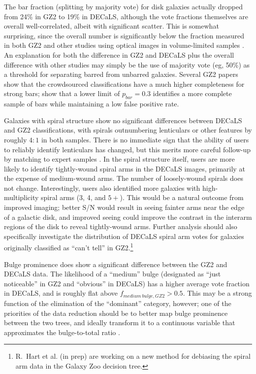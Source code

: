 \documentclass[iop,apj,tighten]{emulateapj}
\begin{document}
The bar fraction (splitting by majority vote) for disk galaxies actually dropped from 24\% in GZ2 to 19\% in DECaLS, although the vote fractions themselves are overall well-correlated, albeit with significant scatter. This is somewhat surprising, since the overall number is significantly below the fraction measured in both GZ2 \citep{mas11c} and other studies using optical images in volume-limited samples \citep[eg,][]{bar08,agu09,lee12}. An explanation for both the difference in GZ2 and DECaLS plus the overall difference with other studies may simply be the use of majority vote (eg, 50\%) as a threshold for separating barred from unbarred galaxies. Several GZ2 papers \citep{hoy11,wil13} show that the crowdsourced classifications have a much higher completeness for strong bars; \citet{gal15} show that a lower limit of $p_{bar}=0.3$ identifies a more complete sample of bars while maintaining a low false positive rate.

Galaxies with spiral structure show no significant differences between DECaLS and GZ2 classifications, with spirals outnumbering lenticulars or other features by roughly $4:1$ in both samples. There is no immediate sign that the ability of users to reliably identify lenticulars has changed, but this merits more careful follow-up by matching to expert samples \citep[eg,][]{nai10}. In the spiral structure itself, users are more likely to identify tightly-wound spiral arms in the DECaLS images, primarily at the expense of medium-wound arms. The number of loosely-wound spirals \citep[which correlates strongly with the presence of a merger; see][]{cas13} does not change. Interestingly, users also identified more galaxies with high-multiplicity spiral arms (3, 4, and $5+$). This would be a natural outcome from improved imaging; better S/N would result in seeing fainter arms near the edge of a galactic disk, and improved seeing could improve the contrast in the interarm regions of the disk to reveal tightly-wound arms. Further analysis should also specifically investigate the distribution of DECaLS spiral arm votes for galaxies originally classified as ``can't tell'' in GZ2.\footnote{R.~Hart et al. (in prep) are working on a new method for debiasing the spiral arm data in the Galaxy Zoo decision tree.}

Bulge prominence does show a significant difference between the GZ2 and DECaLS data. The likelihood of a ``medium'' bulge (designated as ``just noticeable'' in GZ2 and ``obvious'' in DECaLS) has a higher average vote fraction in DECaLS, and is roughly flat above $f_{medium~bulge,GZ2}>0.5$. This may be a strong function of the elimination of the ``dominant'' category, however; one of the priorities of the data reduction should be to better map bulge prominence between the two trees, and ideally transform it to a continuous variable that approximates the bulge-to-total ratio \citep[eg,][]{lac12}. 
\end{document}

